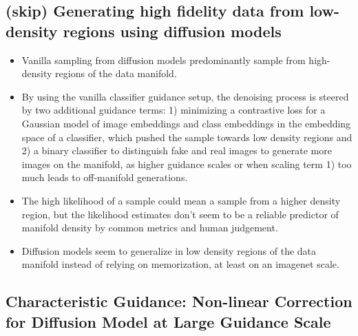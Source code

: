 \documentclass{article}
\begin{document}
\subsection{(skip) Generating high fidelity data from low-density regions using diffusion models}
\begin{itemize}
    \item Vanilla sampling from diffusion models predominantly sample from high-density regions of the data manifold.
    \item By using the vanilla classifier guidance setup, the denoising process is steered by two additional guidance terms: 1) minimizing a contrastive loss for a Gaussian model of image embeddings and class embeddings in the embedding space of a classifier, which pushed the sample towards low density regions and 2) a binary classifier to distinguish fake and real images to generate more images on the manifold, as higher guidance scales or when scaling term 1) too much leads to off-manifold generations. 
    \item The high likelihood of a sample could mean a sample from a higher density region, but the likelihood estimates don't seem to be a reliable predictor of manifold density by common metrics and human judgement. 
    \item Diffusion models seem to generalize in low density regions of the data manifold instead of relying on memorization, at least on an imagenet scale.
\end{itemize}

\subsection{\color{ForestGreen} Characteristic Guidance: Non-linear Correction for Diffusion Model at Large Guidance Scale}
\end{document}
